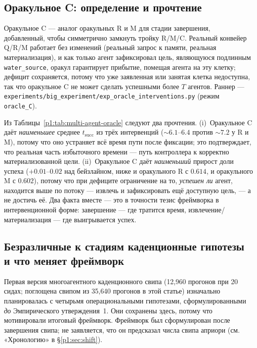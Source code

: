 \documentclass{article}
\newcommand{\method}[1]{\texttt{#1}}
\begin{document}
\subsection{Оракульное C: определение и прочтение}
\label{p1:app:oracle-c-def}

Оракульное C --- аналог оракульных R и M для стадии завершения, добавленный, чтобы симметрично замкнуть тройку R/M/C. Реальный конвейер Q/R/M работает без изменений (реальный запрос к памяти, реальная материализация), и как только агент зафиксировал цель, являющуюся подлинным \texttt{water\_source}, оракул гарантирует прибытие, помещая агента на эту клетку; дефицит сохраняется, потому что уже заявленная или занятая клетка недоступна, так что оракульное C не может сделать успешными более $T$ агентов. Раннер --- \method{experiments/big\_experiment/exp\_oracle\_interventions.py} (режим \method{oracle\_C}).

Из Таблицы~\ref{p1:tab:multi-agent-oracle} следуют два прочтения. (i)~Оракульное C даёт \emph{наименьшее} среднее $t_{\mathrm{succ}}$ из трёх интервенций ($\sim6.1$--$6.4$ против $\sim7.2$ у R и M), потому что оно устраняет всё время пути после фиксации; это подтверждает, что реальная часть избыточного времени --- путь контроллера к корректно материализованной цели. (ii)~Оракульное C даёт \emph{наименьший} прирост доли успеха ($+0.01$--$0.02$ над бейзлайном, ниже и оракульного R с $0.614$, и оракульного M с $0.602$), потому что при дефиците ограничение на то, \emph{успешен ли} агент, находится выше по потоку --- извлечь и зафиксировать ещё доступную цель, --- а не достичь её. Два факта вместе --- это в точности тезис фреймворка в интервенционной форме: завершение --- где тратится время, извлечение/материализация --- где выигрывается успех.

\subsection{Безразличные к стадиям каденционные гипотезы и что меняет фреймворк}
\label{p1:app:standalone-hypotheses}

Первая версия многоагентного каденционного свипа (12{,}960 прогонов при 20 сидах; поглощена свипом из 35{,}640 прогонов в этой статье) изначально планировалась с четырьмя операциональными гипотезами, сформулированными \emph{до} Эмпирического утверждения~1. Они сохранены здесь, потому что мотивировали итоговый фреймворк. Фреймворк был сформулирован после завершения свипа; не заявляется, что он предсказал числа свипа априори (см. «Хронологию» в \S\ref{p1:sec:shift}).
\end{document}
